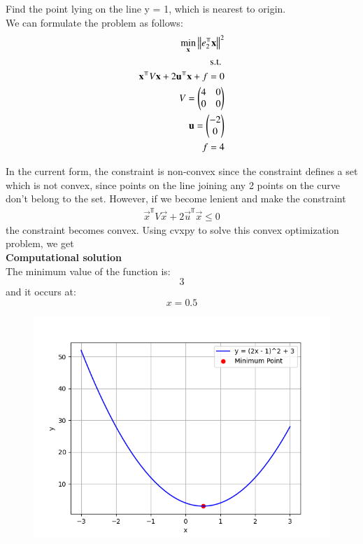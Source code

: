 \documentclass[journal]{IEEEtran}
\begin{document}
Find the point lying on the line y = 1, which is nearest to origin.
\\ We can formulate the problem as follows:
\begin{align}
    \min_{\vec{x}} \norm{e_2^{\Top}\vec{x}}^2\\
    \text{s.t. } \\ \vec{x}^{\Top}V\vec{x} + 2\vec{u}^{\Top}\vec{x} + f = 0\\
    V = \myvec{4 & 0 \\ 0 & 0}\\
    \vec{u} = \myvec{-2 \\ 0}\\
    f = 4
\end{align}

In the current form, the constraint is non-convex since the constraint defines a set which is not convex, since points on the
line joining any 2 points on the curve don't belong to the set. However, if we become lenient and make the constraint
\begin{align}
    \vec{x}^{\Top}V\vec{x} + 2\vec{u}^{\Top}\vec{x} \le 0
\end{align}
the constraint becomes convex. Using cvxpy to solve this convex optimization problem, we get \\

\textbf{Computational solution}\\

The minimum value of the function is:
\[
\boxed{3}
\]
and it occurs at:
\[
\boxed{x = 0.5}
\] 
 \begin{figure}[ht!]
   \centering
   \includegraphics[width=\columnwidth]{figs/Figure_1.png}
\end{figure}
\end{document}
